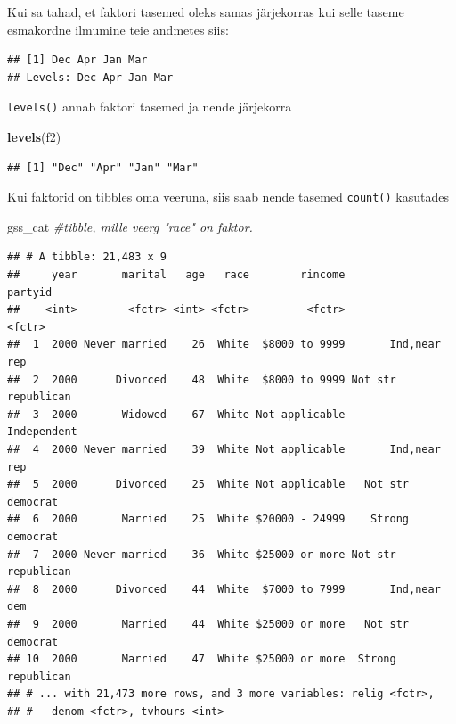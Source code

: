 \documentclass[]{book}
\newenvironment{Shaded}{\begin{snugshade}}{\end{snugshade}}
\newcommand{\KeywordTok}[1]{\textcolor[rgb]{0.13,0.29,0.53}{\textbf{#1}}}
\newcommand{\StringTok}[1]{\textcolor[rgb]{0.31,0.60,0.02}{#1}}
\newcommand{\CommentTok}[1]{\textcolor[rgb]{0.56,0.35,0.01}{\textit{#1}}}
\newcommand{\OperatorTok}[1]{\textcolor[rgb]{0.81,0.36,0.00}{\textbf{#1}}}
\newcommand{\NormalTok}[1]{#1}
\begin{document}
Kui sa tahad, et faktori tasemed oleks samas järjekorras kui selle
taseme esmakordne ilmumine teie andmetes siis:

\begin{Shaded}
\end{Shaded}

\begin{verbatim}
## [1] Dec Apr Jan Mar
## Levels: Dec Apr Jan Mar
\end{verbatim}

\texttt{levels()} annab faktori tasemed ja nende järjekorra

\begin{Shaded}
\begin{Highlighting}[]
\KeywordTok{levels}\NormalTok{(f2)}
\end{Highlighting}
\end{Shaded}

\begin{verbatim}
## [1] "Dec" "Apr" "Jan" "Mar"
\end{verbatim}

Kui faktorid on tibbles oma veeruna, siis saab nende tasemed
\texttt{count()} kasutades

\begin{Shaded}
\begin{Highlighting}[]
\NormalTok{gss_cat }\CommentTok{#tibble, mille veerg "race" on faktor.}
\end{Highlighting}
\end{Shaded}

\begin{verbatim}
## # A tibble: 21,483 x 9
##     year       marital   age   race        rincome            partyid
##    <int>        <fctr> <int> <fctr>         <fctr>             <fctr>
##  1  2000 Never married    26  White  $8000 to 9999       Ind,near rep
##  2  2000      Divorced    48  White  $8000 to 9999 Not str republican
##  3  2000       Widowed    67  White Not applicable        Independent
##  4  2000 Never married    39  White Not applicable       Ind,near rep
##  5  2000      Divorced    25  White Not applicable   Not str democrat
##  6  2000       Married    25  White $20000 - 24999    Strong democrat
##  7  2000 Never married    36  White $25000 or more Not str republican
##  8  2000      Divorced    44  White  $7000 to 7999       Ind,near dem
##  9  2000       Married    44  White $25000 or more   Not str democrat
## 10  2000       Married    47  White $25000 or more  Strong republican
## # ... with 21,473 more rows, and 3 more variables: relig <fctr>,
## #   denom <fctr>, tvhours <int>
\end{verbatim}
\end{document}
